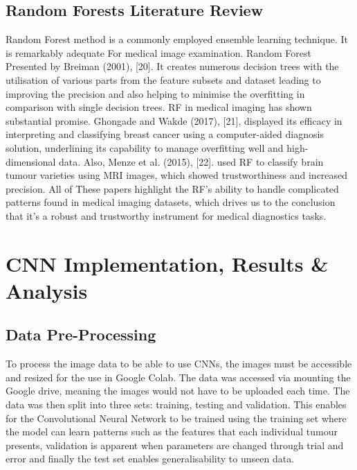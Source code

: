 \documentclass[conference]{IEEEtran}
\begin{document}
\subsection{Random Forests Literature Review}
Random Forest method is a commonly employed ensemble learning technique. It is remarkably adequate For medical image examination. Random Forest Presented by Breiman (2001), [20]. It creates numerous decision trees with the utilisation of various parts from the feature subsets and dataset leading to improving the precision and also helping to minimise the overfitting in comparison with single decision trees. RF in medical imaging has shown substantial promise. Ghongade and Wakde (2017), [21], displayed its efficacy in interpreting and classifying breast cancer using a computer-aided diagnosis solution, underlining its capability to manage overfitting well and high-dimensional data. Also, Menze et al. (2015), [22]. used RF to classify brain tumour varieties using MRI images, which showed trustworthiness and increased precision. All of These papers highlight the RF's ability to handle complicated patterns found in medical imaging datasets, which drives us to the conclusion that it's a robust and trustworthy instrument for medical diagnostics tasks. 

\section{CNN Implementation, Results \& Analysis}
\subsection{Data Pre-Processing}
To process the image data to be able to use CNNs, the images must be accessible and resized for the use in Google Colab. The data was accessed via mounting the Google drive, meaning the images would not have to be uploaded each time. The data was then split into three sets: training, testing and validation. This enables for the Convolutional Neural Network to be trained using the training set where the model can learn patterns such as the features that each individual tumour presents, validation is apparent when parameters are changed through trial and error and finally the test set enables generalisability to unseen data.
\end{document}
